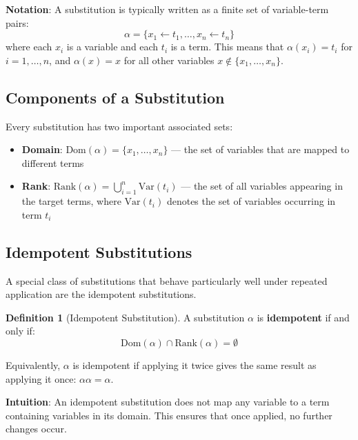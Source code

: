 \documentclass[11pt,a4paper]{article}
\theoremstyle{definition}
\newtheorem{definition}{Definition}[section]
\theoremstyle{plain}
\theoremstyle{remark}
\begin{document}
\textbf{Notation}: A substitution is typically written as a finite set of variable-term pairs:
\[ \alpha = \{ x_1 \leftarrow t_1, \dots, x_n \leftarrow t_n \} \]
where each $x_i$ is a variable and each $t_i$ is a term. This means that $\alpha(x_i) = t_i$ for $i = 1, \dots, n$, and $\alpha(x) = x$ for all other variables $x \notin \{x_1, \dots, x_n\}$.

\subsection{Components of a Substitution}

Every substitution has two important associated sets:

\begin{itemize}
    \item \textbf{Domain}: $\text{Dom}(\alpha) = \{ x_1, \dots, x_n \}$ --- the set of variables that are mapped to different terms
    \item \textbf{Rank}: $\text{Rank}(\alpha) = \bigcup_{i=1}^{n} \text{Var}(t_i)$ --- the set of all variables appearing in the target terms, where $\text{Var}(t_i)$ denotes the set of variables occurring in term $t_i$
\end{itemize}

\subsection{Idempotent Substitutions}

A special class of substitutions that behave particularly well under repeated application are the idempotent substitutions.

\begin{tcolorbox}[colback=red!5!white,colframe=red!75!black,title=\textbf{Idempotence}]
\begin{definition}[Idempotent Substitution]
A substitution $\alpha$ is \textbf{idempotent} if and only if:
\[ \text{Dom}(\alpha) \cap \text{Rank}(\alpha) = \emptyset \]

Equivalently, $\alpha$ is idempotent if applying it twice gives the same result as applying it once: $\alpha\alpha = \alpha$.
\end{definition}
\end{tcolorbox}

\textbf{Intuition}: An idempotent substitution does not map any variable to a term containing variables in its domain. This ensures that once applied, no further changes occur.
\end{document}

